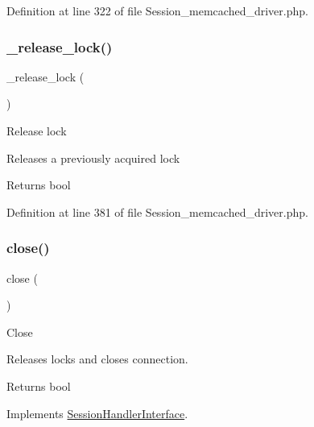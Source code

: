 Definition at line 322 of file Session\+\_\+memcached\+\_\+driver.\+php.

\mbox{\label{class_c_i___session__memcached__driver_a0265e356e6cf1eaba229663c1664c37d}} 
\subsubsection{\texorpdfstring{\_release\_lock()}{\_release\_lock()}}
{\footnotesize\ttfamily \+\_\+release\+\_\+lock (\begin{DoxyParamCaption}{ }\end{DoxyParamCaption})\hspace{0.3cm}{\ttfamily [protected]}}

Release lock

Releases a previously acquired lock

\begin{DoxyReturn}{Returns}
bool 
\end{DoxyReturn}


Definition at line 381 of file Session\+\_\+memcached\+\_\+driver.\+php.

\mbox{\label{class_c_i___session__memcached__driver_aa69c8bf1f1dcf4e72552efff1fe3e87e}} 
\subsubsection{\texorpdfstring{close()}{close()}}
{\footnotesize\ttfamily close (\begin{DoxyParamCaption}{ }\end{DoxyParamCaption})}

Close

Releases locks and closes connection.

\begin{DoxyReturn}{Returns}
bool 
\end{DoxyReturn}


Implements \mbox{\hyperlink{interface_session_handler_interface_aa69c8bf1f1dcf4e72552efff1fe3e87e}{Session\+Handler\+Interface}}.



